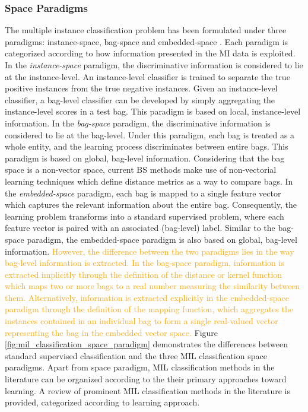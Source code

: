 \subsubsection{Space Paradigms} 
The multiple instance classification problem has been formulated under three paradigms: instance-space, bag-space and embedded-space \citep{Amores2013MIClassification}.  Each paradigm is categorized according to how information presented in the MI data is exploited.  In the \textit{instance-space} paradigm, the discriminative information is considered to lie at the instance-level.  An instance-level classifier is trained to separate the true positive instances from the true negative instances.  Given an instance-level classifier, a bag-level classifier can be developed by simply aggregating the instance-level scores in a test bag.  This paradigm is based on local, instance-level information.  In the \textit{bag-space} paradigm, the discriminative information is considered to lie at the bag-level.  Under this paradigm, each bag is treated as a whole entity, and the learning process discriminates between entire bags.  This paradigm is based on global, bag-level information.  Considering that the bag space is a non-vector space, current BS methods make use of non-vectorial learning techniques which define distance metrics as a way to compare bags.  In the \textit{embedded-space} paradigm, each bag is mapped to a single feature vector which captures the relevant information about the entire bag.  Consequently, the learning problem transforms into a standard supervised problem, where each feature vector is paired with an associated (bag-level) label.  Similar to the bag-space paradigm, the embedded-space paradigm is also based on global, bag-level information.  \textcolor{orange}{However, the difference between the two paradigms lies in the way bag-level information is extracted.  In the bag-space paradigm, information is extracted implicitly through the definition of the distance or kernel function which maps two or more bags to a real number measuring the similarity between them.  Alternatively, information is extracted explicitly in the embedded-space paradigm through the definition of the mapping function, which aggregates the instances contained in an individual bag to form a single real-valued vector representing the bag in the embedded vector space.}  Figure \ref{fig:mil_classification_space_paradigm} demonstrates the differences between standard supervised classification and the three MIL classification space paradigms. Apart from space paradigm, MIL classification methods in the literature can be organized according to the their primary approaches toward learning. A review of prominent MIL classification methods in the literature is provided, categorized according to learning approach.


